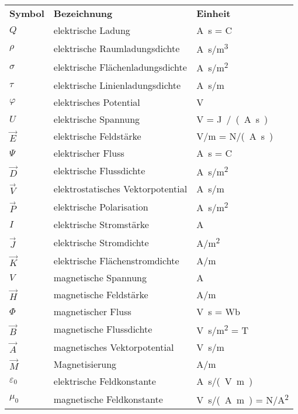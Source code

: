 \begin{tabular}{L{2cm}lL{4cm}}
	\textbf{Symbol} &\textbf{Bezeichnung}              &\textbf{Einheit}\\
	$Q$             &elektrische Ladung                &\si{\A \s} = \si{C}  \\
	$\rho$          &elektrische Raumladungsdichte     &\si{\A \s / \m^3}  \\
	$\sigma$        &elektrische Flächenladungsdichte  &\si{\A \s / \m^2}  \\   
	$\tau$          &elektrische Linienladungsdichte   &\si{\A \s / \m}  \\
	$\varphi$       &elektrisches Potential            &\si{\V}  \\
	$U$             &elektrische Spannung              &\si{\V} = \si{J / (\A \s)} \\
	$\vec{E}$       &elektrische Feldstärke            &\si{\V / \m} = \si{\N / (\A \s)} \\
	$\Psi$          &elektrischer Fluss                &\si{\A \s} = \si{C} \\
	$\vec{D}$       &elektrische Flussdichte           &\si{\A \s / \m^2} \\
	$\vec{V}$       &elektrostatisches Vektorpotential &\si{\A \s / \m} \\
	$\vec{P}$       &elektrische Polarisation          &\si{\A \s / \m^2} \\
	$I$             &elektrische Stromstärke           &\si{\A} \\
	$\vec{J}$       &elektrische Stromdichte           &\si{\A / \m^2} \\
	$\vec{K}$       &elektrische Flächenstromdichte    &\si{\A / \m} \\
	$V$             &magnetische Spannung              &\si{\A} \\
	$\vec{H}$       &magnetische Feldstärke            &\si{\A / \m} \\
	$\Phi$          &magnetischer Fluss                &\si{\V \s} = \si{Wb}\\
	$\vec{B}$       &magnetische Flussdichte           &\si{\V \s / \m^2} = \si{T} \\
	$\vec{A}$       &magnetisches Vektorpotential      &\si{\V \s / \m} \\
	$\vec{M}$       &Magnetisierung                    &\si{\A / \m} \\
	$\varepsilon_0$ &elektrische Feldkonstante         &\si{\A \s / (\V \m)}    \\
	$\mu_0$         &magnetische Feldkonstante         &\si{\V \s / (\A \m)} = \si{\N / \A^2} \\

\end{tabular}
